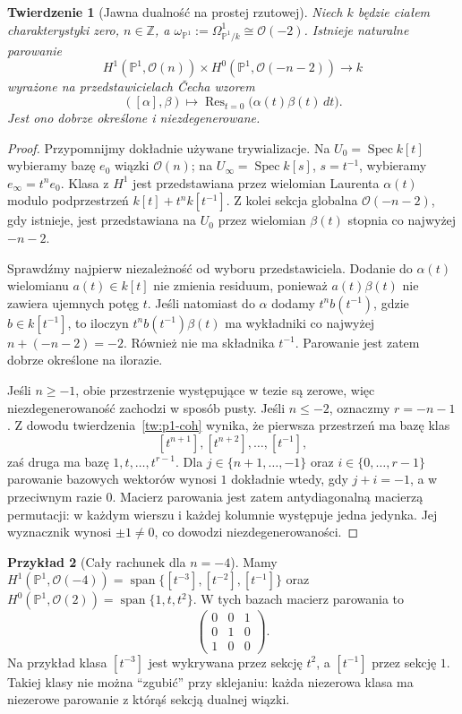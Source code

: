 \documentclass[11pt,a4paper,openany]{report}
\numberwithin{equation}{section}
\theoremstyle{plain}
\newtheorem{twierdzenie}{Twierdzenie}[section]
\theoremstyle{definition}
\newtheorem{przyklad}[twierdzenie]{Przykład}
\theoremstyle{remark}
\newcommand{\Z}{\mathbb Z}
\newcommand{\PP}{\mathbb P}
\newcommand{\Spec}{\operatorname{Spec}}
\begin{document}
\begin{twierdzenie}[Jawna dualność na prostej rzutowej]
\label{tw:serre-p1-explicit}
Niech $k$ będzie ciałem charakterystyki zero,
$n\in\Z$, a $\omega_{\PP^1}:=\Omega^1_{\PP^1/k}
\cong\mathcal O(-2)$. Istnieje naturalne parowanie
\[
 H^1(\PP^1,\mathcal O(n))\times
 H^0(\PP^1,\mathcal O(-n-2))\longrightarrow k
\]
wyrażone na przedstawicielach Čecha wzorem
\[
 ([\alpha],\beta)\longmapsto
 \operatorname{Res}_{t=0}\bigl(\alpha(t)\beta(t)\,dt\bigr).
\]
Jest ono dobrze określone i niezdegenerowane.
\end{twierdzenie}
\begin{proof}
Przypomnijmy dokładnie używane trywializacje.
Na $U_0=\Spec k[t]$ wybieramy bazę $e_0$ wiązki
$\mathcal O(n)$; na $U_\infty=\Spec k[s]$, $s=t^{-1}$,
wybieramy $e_\infty=t^n e_0$. Klasa z $H^1$ jest
przedstawiana przez wielomian Laurenta $\alpha(t)$ modulo
podprzestrzeń $k[t]+t^n k[t^{-1}]$.
Z kolei sekcja globalna $\mathcal O(-n-2)$,
gdy istnieje, jest przedstawiana na $U_0$ przez
wielomian $\beta(t)$ stopnia co najwyżej $-n-2$.

Sprawdźmy najpierw niezależność od wyboru przedstawiciela.
Dodanie do $\alpha(t)$ wielomianu $a(t)\in k[t]$
nie zmienia residuum, ponieważ $a(t)\beta(t)$
nie zawiera ujemnych potęg $t$. Jeśli natomiast do
$\alpha$ dodamy $t^n b(t^{-1})$, gdzie
$b\in k[t^{-1}]$, to iloczyn
$t^n b(t^{-1})\beta(t)$ ma wykładniki co najwyżej
$n+(-n-2)=-2$. Również nie ma składnika $t^{-1}$.
Parowanie jest zatem dobrze określone na ilorazie.

Jeśli $n\ge-1$, obie przestrzenie występujące
w tezie są zerowe, więc niezdegenerowaność zachodzi
w sposób pusty. Jeśli $n\le-2$, oznaczmy $r=-n-1$.
Z dowodu twierdzenia~\ref{tw:p1-coh} wynika, że
pierwsza przestrzeń ma bazę klas
\[
 [t^{n+1}],[t^{n+2}],\ldots,[t^{-1}],
\]
zaś druga ma bazę $1,t,\ldots,t^{r-1}$.
Dla $j\in\{n+1,\ldots,-1\}$ oraz
$i\in\{0,\ldots,r-1\}$ parowanie bazowych
wektorów wynosi $1$ dokładnie wtedy, gdy
$j+i=-1$, a w przeciwnym razie $0$.
Macierz parowania jest zatem antydiagonalną macierzą
permutacji: w każdym wierszu i każdej kolumnie występuje
jedna jedynka. Jej wyznacznik wynosi $\pm1\ne0$,
co dowodzi niezdegenerowaności.
\end{proof}

\begin{przyklad}[Cały rachunek dla $n=-4$]
Mamy
$H^1(\PP^1,\mathcal O(-4))
=\operatorname{span}\{[t^{-3}],[t^{-2}],[t^{-1}]\}$
oraz $H^0(\PP^1,\mathcal O(2))
=\operatorname{span}\{1,t,t^2\}$.
W tych bazach macierz parowania to
\[
 \begin{pmatrix}0&0&1\\0&1&0\\1&0&0\end{pmatrix}.
\]
Na przykład klasa $[t^{-3}]$ jest wykrywana
przez sekcję $t^2$, a $[t^{-1}]$ przez sekcję $1$.
Takiej klasy nie można ``zgubić'' przy sklejaniu:
każda niezerowa klasa ma niezerowe parowanie z którąś
sekcją dualnej wiązki.
\end{przyklad}
\end{document}
